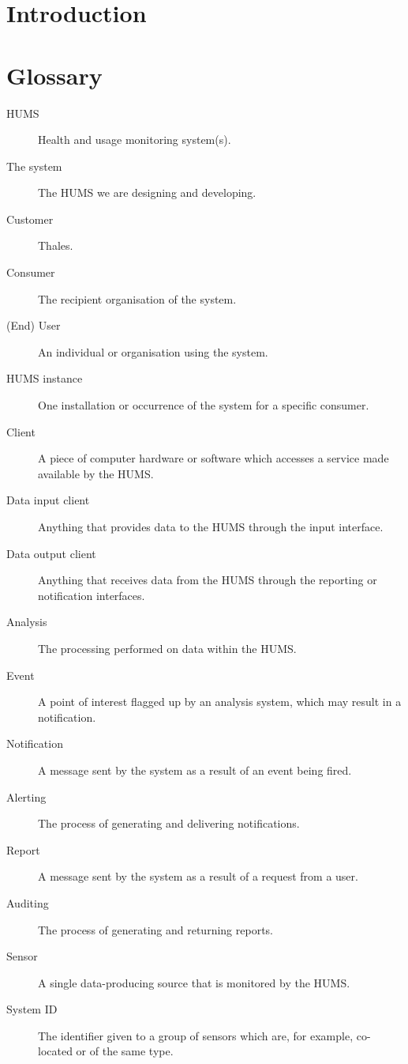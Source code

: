 \documentclass[10pt,a4paper]{article}
\begin{document}


\section{Introduction}

\section{Glossary}

\begin{description}
	\item[HUMS] Health and usage monitoring system(s).
	\item[The system] The HUMS we are designing and developing.
	\item[Customer] Thales.
	\item[Consumer] The recipient organisation of the system.
	\item[(End) User] An individual or organisation using the system.
	\item[HUMS instance] One installation or occurrence of the system for a specific consumer.
	\item[Client] A piece of computer hardware or software which accesses a service made available by the HUMS.
	\item[Data input client] Anything that provides data to the HUMS through the input interface.
	\item[Data output client] Anything that receives data from the HUMS through the reporting or notification interfaces.
	\item[Analysis] The processing performed on data within the HUMS.
	\item[Event] A point of interest flagged up by an analysis system, which may result in a notification.
	\item[Notification] A message sent by the system as a result of an event being fired.
	\item[Alerting] The process of generating and delivering notifications.
	\item[Report] A message sent by the system as a result of a request from a user.
	\item[Auditing] The process of generating and returning reports.
	\item[Sensor] A single data-producing source that is monitored by the HUMS.
	\item[System ID] The identifier given to a group of sensors which are, for example, co-located or of the same type.
\end{description}
\end{document}
